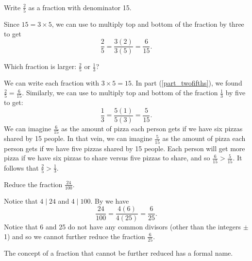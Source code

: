 \begin{exam}
\label{exam_equal_fractions}
~
    \begin{apart}
        \item \label{part_twofifths} Write $\frac{2}{5}$ as a fraction with denominator 15.
        \begin{soln}
            Since $15=3 \times 5$, we can use  to multiply top and bottom of the fraction by three to get
            $$\frac{2}{5} =\frac{3(2)}{3(5)}
            =\frac{6}{15}.$$
        \end{soln}

        \item Which fraction is larger: $\frac{2}{5}$ or $\frac{1}{3}$?
        \begin{soln}
            We can write each fraction with  $3 \times 5 = 15.$  In part (\ref{part_twofifths}), we found $\frac{2}{5} =\frac{6}{15}.$ Similarly, we can use  to multiply top and bottom of the fraction $\frac{1}{3}$ by five to get:
            $$\frac{1}{3} =\frac{5(1)}{5(3)}
            =\frac{5}{15}.$$
            We can imagine $\frac{6}{15}$ as the amount of pizza each person gets if we have six pizzas shared by 15 people.  In that vein, we can imagine $\frac{5}{15}$ as the amount of pizza each person gets if we have five pizzas shared by 15 people. Each person will get more pizza if we have six pizzas to share versus five pizzas to share, and so $\frac{6}{15}> \frac{5}{15}$.
            It follows that $\frac{2}{5}>\frac{1}{3}.$
        \end{soln}

        \item Reduce the fraction $\frac{24}{100}$.
        \begin{soln}
            Notice that $4 \mid 24$ and $4 \mid 100$.  By  we have
            $$\frac{24}{100} = \frac{4(6)}{4(25)}= \frac{6}{25}.$$
            Notice that 6 and 25 do not have any common divisors (other than the integers $\pm$1) and so we cannot further reduce the fraction $\frac{6}{25}$.
        \end{soln}
    \end{apart}
\end{exam}

The concept of a fraction that cannot be further reduced has a formal name.

